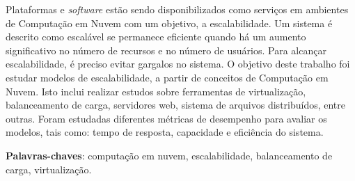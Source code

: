 \begin{resumo}
Plataformas e \textit{software} estão sendo disponibilizados como serviços em ambientes de Computação em Nuvem com um objetivo, a escalabilidade. Um sistema é descrito como escalável se permanece eficiente quando há um aumento significativo no número de recursos e no número de usuários. Para alcançar escalabilidade, é preciso evitar gargalos no sistema. O objetivo deste trabalho foi estudar modelos de escalabilidade, a partir de conceitos de Computação em Nuvem. Isto inclui realizar estudos sobre ferramentas de virtualização, balanceamento de carga, servidores web, sistema de arquivos distribuídos, entre outras. Foram estudadas diferentes métricas de desempenho para avaliar os modelos, tais como: tempo de resposta, capacidade e eficiência do sistema.
 
 \vspace{\onelineskip}
    
 \noindent
 \textbf{Palavras-chaves}: computação em nuvem, escalabilidade, balanceamento de carga, virtualização.
\end{resumo}